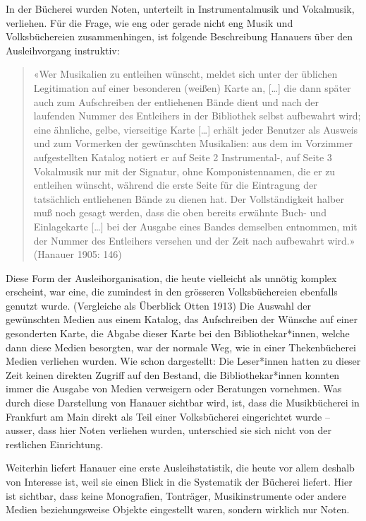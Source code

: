 \documentclass[a4paper,
fontsize=11pt,
oneside,
numbers=noperiodatend,
parskip=half-,
bibliography=totoc,
final
]{scrartcl}
\begin{document}
In der Bücherei wurden Noten, unterteilt in Instrumentalmusik und
Vokalmusik, verliehen. Für die Frage, wie eng oder gerade nicht eng
Musik und Volksbüchereien zusammenhingen, ist folgende Beschreibung
Hanauers über den Ausleihvorgang instruktiv:

\begin{quote}
«Wer Musikalien zu entleihen wünscht, meldet sich unter der üblichen
Legitimation auf einer besonderen (weißen) Karte an, {[}\ldots{]} die
dann später auch zum Aufschreiben der entliehenen Bände dient und nach
der laufenden Nummer des Entleihers in der Bibliothek selbst aufbewahrt
wird; eine ähnliche, gelbe, vierseitige Karte {[}\ldots{]} erhält jeder
Benutzer als Ausweis und zum Vormerken der gewünschten Musikalien: aus
dem im Vorzimmer aufgestellten Katalog notiert er auf Seite 2
Instrumental-, auf Seite 3 Vokalmusik nur mit der Signatur, ohne
Komponistennamen, die er zu entleihen wünscht, während die erste Seite
für die Eintragung der tatsächlich entliehenen Bände zu dienen hat. Der
Vollständigkeit halber muß noch gesagt werden, dass die oben bereits
erwähnte Buch- und Einlagekarte {[}\ldots{]} bei der Ausgabe eines
Bandes demselben entnommen, mit der Nummer des Entleihers versehen und
der Zeit nach aufbewahrt wird.» (Hanauer 1905: 146)
\end{quote}

Diese Form der Ausleihorganisation, die heute vielleicht als unnötig
komplex erscheint, war eine, die zumindest in den grösseren
Volksbüchereien ebenfalls genutzt wurde. (Vergleiche als Überblick Otten
1913) Die Auswahl der gewünschten Medien aus einem Katalog, das
Aufschreiben der Wünsche auf einer gesonderten Karte, die Abgabe dieser
Karte bei den Bibliothekar*innen, welche dann diese Medien besorgten,
war der normale Weg, wie in einer Thekenbücherei Medien verliehen
wurden. Wie schon dargestellt: Die Leser*innen hatten zu dieser Zeit
keinen direkten Zugriff auf den Bestand, die Bibliothekar*innen konnten
immer die Ausgabe von Medien verweigern oder Beratungen vornehmen. Was
durch diese Darstellung von Hanauer sichtbar wird, ist, dass die
Musikbücherei in Frankfurt am Main direkt als Teil einer Volksbücherei
eingerichtet wurde -- ausser, dass hier Noten verliehen wurden,
unterschied sie sich nicht von der restlichen Einrichtung.

Weiterhin liefert Hanauer eine erste Ausleihstatistik, die heute vor
allem deshalb von Interesse ist, weil sie einen Blick in die Systematik
der Bücherei liefert. Hier ist sichtbar, dass keine Monografien,
Tonträger, Musikinstrumente oder andere Medien beziehungsweise Objekte
eingestellt waren, sondern wirklich nur Noten.
\end{document}
